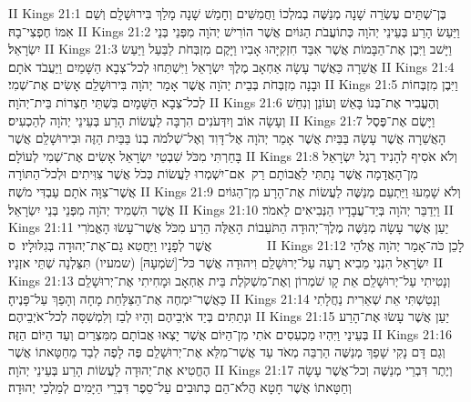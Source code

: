 II Kings 21:1	בֶּן־שְׁתֵּים עֶשְׂרֵה שָׁנָה מְנַשֶּׁה בְמלְכוֹ וַחֲמִשִּׁים וְחָמֵשׁ שָׁנָה מָלַךְ בִּירוּשָׁלָ͏ִם וְשֵׁם אִמּוֹ חֶפְצִי־בָהּ׃
II Kings 21:2	וַיַּעַשׂ הָרַע בְּעֵינֵי יְהֹוָה כְּתוֹעֲבֹת הַגּוֹיִם אֲשֶׁר הוֹרִישׁ יְהֹוָה מִפְּנֵי בְּנֵי יִשְׂרָאֵל׃
II Kings 21:3	וַיָּשׁב וַיִּבֶן אֶת־הַבָּמוֹת אֲשֶׁר אִבַּד חִזְקִיָּהוּ אָבִיו וַיָּקֶם מִזְבְּחֹת לַבַּעַל וַיַּעַשׂ אֲשֵׁרָה כַּאֲשֶׁר עָשָׂה אַחְאָב מֶלֶךְ יִשְׂרָאֵל וַיִּשְׁתַּחוּ לְכל־צְבָא הַשָּׁמַיִם וַיַּעֲבֹד אֹתָם׃
II Kings 21:4	וּבָנָה מִזְבְּחֹת בְּבֵית יְהֹוָה אֲשֶׁר אָמַר יְהֹוָה בִּירוּשָׁלַ͏ִם אָשִׂים אֶת־שְׁמִי׃
II Kings 21:5	וַיִּבֶן מִזְבְּחוֹת לְכל־צְבָא הַשָּׁמָיִם בִּשְׁתֵּי חַצְרוֹת בֵּית־יְהֹוָה׃
II Kings 21:6	וְהֶעֱבִיר אֶת־בְּנוֹ בָּאֵשׁ וְעוֹנֵן וְנִחֵשׁ וְעָשָׂה אוֹב וְיִדְּעֹנִים הִרְבָּה לַעֲשׂוֹת הָרַע בְּעֵינֵי יְהֹוָה לְהַכְעִיס׃
II Kings 21:7	וַיָּשֶׂם אֶת־פֶּסֶל הָאֲשֵׁרָה אֲשֶׁר עָשָׂה בַּבַּיִת אֲשֶׁר אָמַר יְהֹוָה אֶל־דָּוִד וְאֶל־שְׁלֹמֹה בְנוֹ בַּבַּיִת הַזֶּה וּבִירוּשָׁלַ͏ִם אֲשֶׁר בָּחַרְתִּי מִכֹּל שִׁבְטֵי יִשְׂרָאֵל אָשִׂים אֶת־שְׁמִי לְעוֹלָם׃
II Kings 21:8	וְלֹא אֹסִיף לְהָנִיד רֶגֶל יִשְׂרָאֵל מִן־הָאֲדָמָה אֲשֶׁר נָתַתִּי לַאֲבוֹתָם רַק  אִם־יִשְׁמְרוּ לַעֲשׂוֹת כְּכֹל אֲשֶׁר צִוִּיתִים וּלְכל־הַתּוֹרָה אֲשֶׁר־צִוָּה אֹתָם עַבְדִּי מֹשֶׁה׃
II Kings 21:9	וְלֹא שָׁמֵעוּ וַיַּתְעֵם מְנַשֶּׁה לַעֲשׂוֹת אֶת־הָרָע מִן־הַגּוֹיִם אֲשֶׁר הִשְׁמִיד יְהֹוָה מִפְּנֵי בְּנֵי יִשְׂרָאֵל׃
II Kings 21:10	וַיְדַבֵּר יְהֹוָה בְּיַד־עֲבָדָיו הַנְּבִיאִים לֵאמֹר׃
II Kings 21:11	יַעַן אֲשֶׁר עָשָׂה מְנַשֶּׁה מֶלֶךְ־יְהוּדָה הַתֹּעֵבוֹת הָאֵלֶּה הֵרַע מִכֹּל אֲשֶׁר־עָשׂוּ הָאֱמֹרִי אֲשֶׁר לְפָנָיו וַיַּחֲטִא גַם־אֶת־יְהוּדָה בְּגִלּוּלָיו׃ {ס}        
II Kings 21:12	לָכֵן כֹּה־אָמַר יְהֹוָה אֱלֹהֵי יִשְׂרָאֵל הִנְנִי מֵבִיא רָעָה עַל־יְרוּשָׁלַ͏ִם וִיהוּדָה אֲשֶׁר כּל־[שֹׁמְעָהּ] (שמעיו) תִּצַּלְנָה שְׁתֵּי אזְנָיו׃
II Kings 21:13	וְנָטִיתִי עַל־יְרוּשָׁלַ͏ִם אֵת קָו שֹׁמְרוֹן וְאֶת־מִשְׁקֹלֶת בֵּית אַחְאָב וּמָחִיתִי אֶת־יְרוּשָׁלַ͏ִם כַּאֲשֶׁר־יִמְחֶה אֶת־הַצַּלַּחַת מָחָה וְהָפַךְ עַל־פָּנֶיהָ׃
II Kings 21:14	וְנָטַשְׁתִּי אֵת שְׁאֵרִית נַחֲלָתִי וּנְתַתִּים בְּיַד אֹיְבֵיהֶם וְהָיוּ לְבַז וְלִמְשִׁסָּה לְכל־אֹיְבֵיהֶם׃
II Kings 21:15	יַעַן אֲשֶׁר עָשׂוּ אֶת־הָרַע בְּעֵינַי וַיִּהְיוּ מַכְעִסִים אֹתִי מִן־הַיּוֹם אֲשֶׁר יָצְאוּ אֲבוֹתָם מִמִּצְרַיִם וְעַד הַיּוֹם הַזֶּה׃
II Kings 21:16	וְגַם דָּם נָקִי שָׁפַךְ מְנַשֶּׁה הַרְבֵּה מְאֹד עַד אֲשֶׁר־מִלֵּא אֶת־יְרוּשָׁלַ͏ִם פֶּה לָפֶה לְבַד מֵחַטָּאתוֹ אֲשֶׁר הֶחֱטִיא אֶת־יְהוּדָה לַעֲשׂוֹת הָרַע בְּעֵינֵי יְהֹוָה׃
II Kings 21:17	וְיֶתֶר דִּבְרֵי מְנַשֶּׁה וְכל־אֲשֶׁר עָשָׂה וְחַטָּאתוֹ אֲשֶׁר חָטָא הֲלֹא־הֵם כְּתוּבִים עַל־סֵפֶר דִּבְרֵי הַיָּמִים לְמַלְכֵי יְהוּדָה׃
